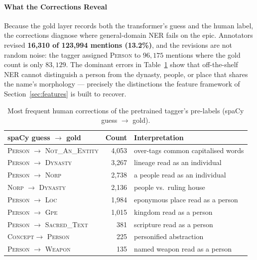 \documentclass[conference]{IEEEtran}
\begin{document}
\paragraph{What the Corrections Reveal}
Because the gold layer records both the transformer's guess and the human label, the corrections diagnose where general-domain NER fails on the epic. Annotators revised \textbf{16{,}310 of 123{,}994 mentions (13.2\%)}, and the revisions are not random noise: the tagger assigned \textsc{Person} to $96{,}175$ mentions where the gold count is only $83{,}129$. The dominant errors in Table~\ref{tab:corrections} show that off-the-shelf NER cannot distinguish a person from the dynasty, people, or place that shares the name's morphology --- precisely the distinctions the feature framework of Section~\ref{sec:features} is built to recover.

\begin{table}[!t]
\centering
\caption{Most frequent human corrections of the pretrained tagger's pre-labels (spaCy guess $\rightarrow$ gold).}
\label{tab:corrections}
\footnotesize
\begin{tabularx}{\columnwidth}{@{}l r X@{}}
\toprule
\textbf{spaCy guess $\rightarrow$ gold} & \textbf{Count} & \textbf{Interpretation} \\
\midrule
\textsc{Person} $\rightarrow$ \textsc{Not\_An\_Entity} & 4{,}053 & over-tags common capitalised words \\
\textsc{Person} $\rightarrow$ \textsc{Dynasty}          & 3{,}267 & lineage read as an individual \\
\textsc{Person} $\rightarrow$ \textsc{Norp}             & 2{,}738 & a people read as an individual \\
\textsc{Norp}   $\rightarrow$ \textsc{Dynasty}          & 2{,}136 & people vs.\ ruling house \\
\textsc{Person} $\rightarrow$ \textsc{Loc}              & 1{,}984 & eponymous place read as a person \\
\textsc{Person} $\rightarrow$ \textsc{Gpe}              & 1{,}015 & kingdom read as a person \\
\textsc{Person} $\rightarrow$ \textsc{Sacred\_Text}     & 381     & scripture read as a person \\
\textsc{Concept}$\rightarrow$ \textsc{Person}           & 225     & personified abstraction \\
\textsc{Person} $\rightarrow$ \textsc{Weapon}           & 135     & named weapon read as a person \\
\bottomrule
\end{tabularx}
\end{table}
\end{document}
